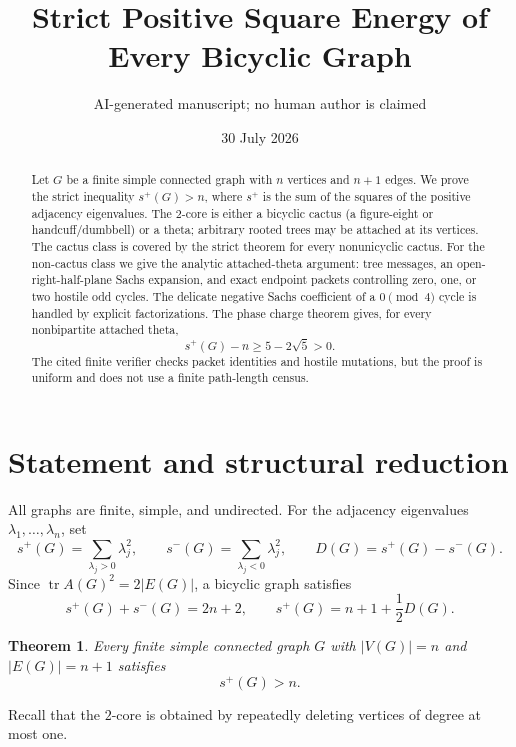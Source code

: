 \documentclass[11pt]{article}
\title{Strict Positive Square Energy of Every Bicyclic Graph}
\author{AI-generated manuscript; no human author is claimed}
\date{30 July 2026}
\newtheorem{theorem}{Theorem}[section]
\theoremstyle{remark}
\newcommand{\splus}{s^+}
\newcommand{\sminus}{s^-}
\begin{document}
\maketitle

\begin{abstract}
Let $G$ be a finite simple connected graph with $n$ vertices and $n+1$
edges.  We prove the strict inequality $\splus(G)>n$, where $\splus$ is the
sum of the squares of the positive adjacency eigenvalues.  The $2$-core is
either a bicyclic cactus (a figure-eight or handcuff/dumbbell) or a theta;
arbitrary rooted trees may be attached at its vertices.  The cactus class is
covered by the strict theorem for every nonunicyclic cactus.  For the
non-cactus class we give the analytic attached-theta argument: tree messages,
an open-right-half-plane Sachs expansion, and exact endpoint packets controlling
zero, one, or two hostile odd cycles.  The delicate negative Sachs coefficient
of a $0\pmod4$ cycle is handled by explicit factorizations.  The phase charge
theorem gives, for every nonbipartite attached theta,
\[
 \splus(G)-n\geq5-2\sqrt5>0.
\]
The cited finite verifier checks packet identities and hostile mutations, but
the proof is uniform and does not use a finite path-length census.
\end{abstract}

\section{Statement and structural reduction}

All graphs are finite, simple, and undirected.  For the adjacency eigenvalues
$\lambda_1,\ldots,\lambda_n$, set
\[
 \splus(G)=\sum_{\lambda_j>0}\lambda_j^2,\qquad
 \sminus(G)=\sum_{\lambda_j<0}\lambda_j^2,\qquad
 D(G)=\splus(G)-\sminus(G).
\]
Since $\operatorname{tr}A(G)^2=2|E(G)|$, a bicyclic graph satisfies
\begin{equation}\label{eq:energy}
 \splus(G)+\sminus(G)=2n+2,
 \qquad \splus(G)=n+1+\frac12D(G).
\end{equation}

\begin{theorem}\label{thm:main}
Every finite simple connected graph $G$ with $|V(G)|=n$ and
$|E(G)|=n+1$ satisfies
\[
 \boxed{\splus(G)>n}.
\]
\end{theorem}

Recall that the $2$-core is obtained by repeatedly deleting vertices of degree
at most one.
\end{document}
